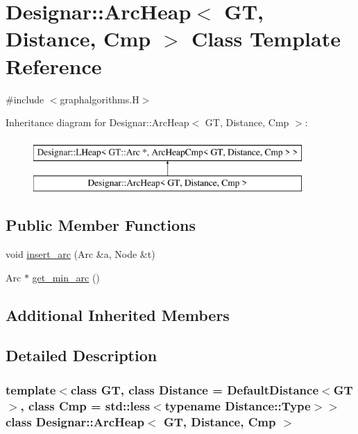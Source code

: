 \hypertarget{class_designar_1_1_arc_heap}{}\section{Designar\+:\+:Arc\+Heap$<$ GT, Distance, Cmp $>$ Class Template Reference}
\label{class_designar_1_1_arc_heap}


{\ttfamily \#include $<$graphalgorithms.\+H$>$}

Inheritance diagram for Designar\+:\+:Arc\+Heap$<$ GT, Distance, Cmp $>$\+:\begin{figure}[H]
\begin{center}
\leavevmode
\includegraphics[height=2.000000cm]{class_designar_1_1_arc_heap}
\end{center}
\end{figure}
\subsection*{Public Member Functions}
\begin{DoxyCompactItemize}
\item 
void \hyperlink{class_designar_1_1_arc_heap_a578a5310c000e671cb967799317f534d}{insert\+\_\+arc} (Arc \&a, Node \&t)
\item 
Arc $\ast$ \hyperlink{class_designar_1_1_arc_heap_aa97981f64e6a7868d4d8b310bfd6b1cb}{get\+\_\+min\+\_\+arc} ()
\end{DoxyCompactItemize}
\subsection*{Additional Inherited Members}


\subsection{Detailed Description}
\subsubsection*{template$<$class GT, class Distance = Default\+Distance$<$\+G\+T$>$, class Cmp = std\+::less$<$typename Distance\+::\+Type$>$$>$\newline
class Designar\+::\+Arc\+Heap$<$ G\+T, Distance, Cmp $>$}



